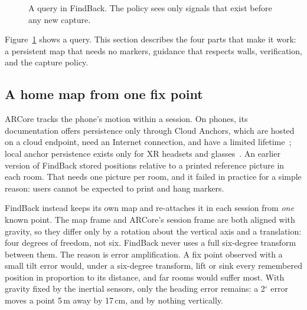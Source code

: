 \documentclass[sigconf,10pt]{acmart}
\newcommand{\sys}{FindBack}
\begin{document}
\begin{figure}[t]
\centering
{}
\caption{A query in \sys{}. The policy sees only signals that exist before any new capture.}
\label{fig:overview}
\end{figure}

Figure~\ref{fig:overview} shows a query.
This section describes the four parts that make it work: a persistent map that needs no markers,
guidance that respects walls, verification, and the capture policy.

\subsection{A home map from one fix point}

ARCore tracks the phone's motion within a session.
On phones, its documentation offers persistence only through Cloud Anchors, which are hosted on a
cloud endpoint, need an Internet connection, and have a limited
lifetime~\cite{google2026cloudanchors,google2026cloudanchorsguide}; local anchor persistence
exists only for XR headsets and glasses~\cite{google2026jetpackxranchors}.
An earlier version of \sys{} stored positions relative to a printed reference picture in each
room.
That needs one picture per room, and it failed in practice for a simple reason: users cannot be
expected to print and hang markers.

\sys{} instead keeps its own map and re-attaches it in each session from \emph{one} known point.
The map frame and ARCore's session frame are both aligned with gravity, so they differ only by a
rotation about the vertical axis and a translation: four degrees of freedom, not six.
\sys{} never uses a full six-degree transform between them.
The reason is error amplification.
A fix point observed with a small tilt error would, under a six-degree transform, lift or sink
every remembered position in proportion to its distance, and far rooms would suffer most.
With gravity fixed by the inertial sensors, only the heading error remains: a 2$^\circ$ error
moves a point 5\,m away by 17\,cm, and by nothing vertically.
\end{document}
